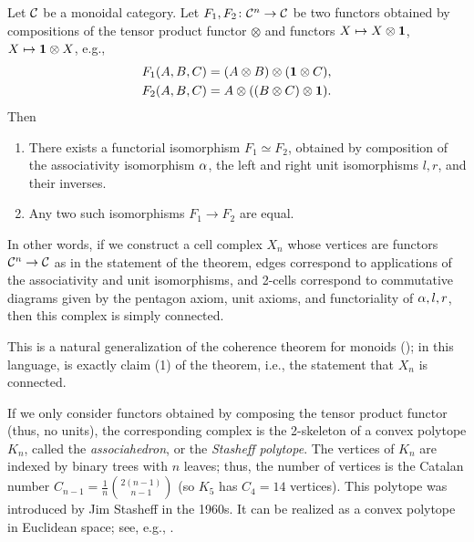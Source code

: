 \begin{theorem}\label{t:maclane}\par

  \noindent Let $\mathcal{C}$ be a monoidal category. Let
  $F_1, F_2\colon \mathcal{C}^n\to \mathcal{C}$ be two functors obtained by compositions of
  the tensor product functor $\otimes$ and functors $X\mapsto X\otimes \mathbf{1}$,
  $X\mapsto \mathbf{1} \otimes X$, e.g.,
  \begin{align*}
    F_1(A,B,C)&=(A\otimes B)\otimes (\mathbf{1}\otimes C),\\
    F_2(A,B,C)&=A\otimes (( B\otimes  C)\otimes \mathbf{1}).
  \end{align*}
  Then
  \begin{enumerate}
    \item There exists a functorial isomorphism $F_1\simeq F_2$, obtained
      by composition of the associativity isomorphism $\alpha$, the left and right
      unit isomorphisms $l,r$, and their inverses.
    \item Any two such isomorphisms $F_1\to F_2$ are equal.
  \end{enumerate}
\end{theorem}
In other words, if we construct a cell complex $X_n$ whose vertices are functors
$\mathcal{C}^n\to \mathcal{C}$ as in the statement of the theorem, edges correspond to
applications of the associativity and unit isomorphisms, and 2-cells correspond
to commutative diagrams given by the pentagon axiom, unit axioms, and
functoriality of $\alpha, l, r$, then this complex is simply connected.

This is a natural generalization of the coherence theorem for monoids
(); in this language, 
is exactly claim (1) of the theorem, i.e., the statement that $X_n$
is connected.

\begin{remark}\label{r:stasheff}
  If we only consider functors obtained by composing the tensor product functor
  (thus, no units), the corresponding complex is the 2-skeleton of a convex
  polytope $K_n$, called the \emph{associahedron}, or the
  \emph{Stasheff
  polytope}. The vertices of $K_n$ are indexed by
  binary trees with $n$ leaves; thus, the number of vertices is the Catalan
  number $C_{n-1} = \frac{1}{n}\binom{2(n-1)}{n-1}$ (so $K_5$ has
  $C_4 = 14$ vertices).
  This polytope was introduced by Jim Stasheff in the 1960s. It can be realized
  as a convex polytope in Euclidean space; see, e.g.,
  \cite{loday}.
\end{remark}

